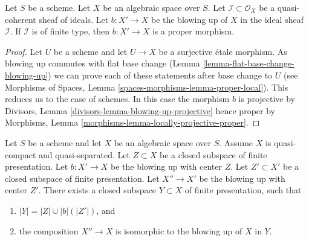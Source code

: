 \begin{lemma}
\label{lemma-blowing-up-projective}
Let $S$ be a scheme. Let $X$ be an algebraic space over $S$.
Let $\mathcal{I} \subset \mathcal{O}_X$ be a quasi-coherent
sheaf of ideals. Let $b : X' \to X$ be the blowing up of $X$
in the ideal sheaf $\mathcal{I}$. If $\mathcal{I}$ is of finite type, then
$b : X' \to X$ is a proper morphism.
\end{lemma}

\begin{proof}
Let $U$ be a scheme and let $U \to X$ be a surjective \'etale morphism.
As blowing up commutes with flat base change
(Lemma \ref{lemma-flat-base-change-blowing-up})
we can prove each of these statements after base change to $U$
(see Morphisms of Spaces, Lemma
\ref{spaces-morphisms-lemma-proper-local}).
This reduces us to the case of schemes.
In this case the morphism $b$ is projective by
Divisors, Lemma \ref{divisors-lemma-blowing-up-projective}
hence proper by
Morphisms, Lemma \ref{morphisms-lemma-locally-projective-proper}.
\end{proof}

\begin{lemma}
\label{lemma-composition-finite-type-blowups}
Let $S$ be a scheme and let $X$ be an algebraic space over $S$.
Assume $X$ is quasi-compact and quasi-separated.
Let $Z \subset X$ be a closed subspace of finite presentation.
Let $b : X' \to X$ be the blowing up with center $Z$.
Let $Z' \subset X'$ be a closed subspace of finite presentation.
Let $X'' \to X'$ be the blowing up with center $Z'$.
There exists a closed subspace $Y \subset X$ of finite presentation,
such that
\begin{enumerate}
\item $|Y| = |Z| \cup |b|(|Z'|)$, and
\item the composition $X'' \to X$ is isomorphic to the blowing up
of $X$ in $Y$.
\end{enumerate}
\end{lemma}

